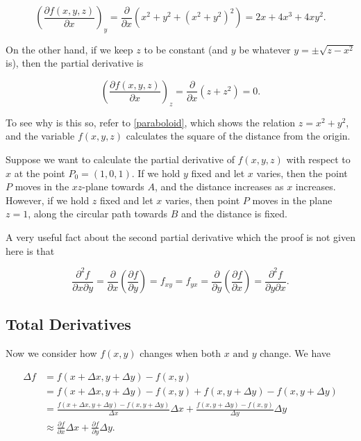 \documentclass[english,a4paper,12pt]{report}
\begin{document}
\begin{equation}
	\left( \frac{\partial f(x,y,z)}{\partial x}  \right)_{y} = \frac{\partial }{\partial x} (x^2+y^2+(x^2+y^2)^2) = 2x+4x^3 +4xy^2.  
\end{equation}

On the other hand, if we keep \(z\) to be constant (and \(y\) be whatever \(y = \pm \sqrt{z-x^2} \) is), then the partial derivative is 

\begin{equation}
	\left( \frac{\partial f(x,y,z)}{\partial x}  \right)_{z} = \frac{\partial }{\partial x} (z+z^2) = 0. 
\end{equation}

To see why is this so, refer to \cref{paraboloid}, which shows the relation \(z = x^2+y^2\), and the variable \(f(x,y,z)\) calculates the square of the distance from the origin. 

Suppose we want to calculate the partial derivative of \(f(x,y,z)\) with respect to \(x\) at the point \(P_0 = (1,0,1)\). If we hold \(y\) fixed and let \(x\) varies, then the point \(P\) moves in the \(xz\)-plane towards \(A\), and the distance increases as \(x\) increases. However, if we hold \(z\) fixed and let \(x\) varies, then point \(P\) moves in the plane \(z = 1\), along the circular path towards \(B\) and the distance is fixed.   


A very useful fact about the second partial derivative which the proof is not given here is that 

\begin{equation}
    \frac{\partial^2 f}{\partial x \partial y} = \frac{\partial }{\partial x} \left( \frac{\partial f}{\partial y}  \right) = f_{xy} = f_{yx} = \frac{\partial }{\partial y} \left( \frac{\partial f}{\partial x}  \right) = \frac{\partial^2 f}{\partial y \partial x}.     
\end{equation}

\subsection{Total Derivatives}

Now we consider how \(f(x,y)\) changes when both \(x \text { and } y\) change. We have

\begin{equation} \label{totaldf} 
    \begin{aligned}
        \Delta f &= f(x+\Delta x,y+\Delta y) - f(x,y) \\
        &= f(x+\Delta x,y+\Delta y) - f(x,y) + f(x,y+\Delta y) - f(x,y+\Delta y) \\
        &= \frac{f(x+\Delta x,y+\Delta y)-f(x,y+\Delta y)}{\Delta x}\Delta x + \frac{f(x,y+\Delta y)-f(x,y)}{\Delta y} \Delta y \\
        &\approx \frac{\partial f}{\partial x} \Delta x + \frac{\partial f}{\partial y} \Delta y. 
    \end{aligned}
\end{equation}
\end{document}

